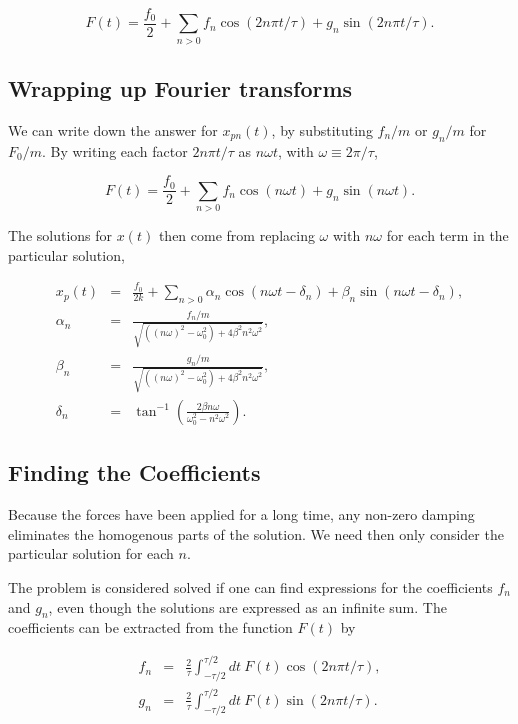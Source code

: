 \documentclass[%
oneside,                 %
final,                   %
10pt]{article}
\begin{document}
\begin{equation}
F(t)=\frac{f_0}{2}+\sum_{n>0} f_n\cos(2n\pi t/\tau)+g_n\sin(2n\pi t/\tau).
\end{equation}

\subsection*{Wrapping up Fourier transforms}

We can write down the answer for
$x_{pn}(t)$, by substituting $f_n/m$ or $g_n/m$ for $F_0/m$. By
writing each factor $2n\pi t/\tau$ as $n\omega t$, with $\omega\equiv
2\pi/\tau$,

\begin{equation}
\label{eq:fourierdef1}
F(t)=\frac{f_0}{2}+\sum_{n>0}f_n\cos(n\omega t)+g_n\sin(n\omega t).
\end{equation}

The solutions for $x(t)$ then come from replacing $\omega$ with
$n\omega$ for each term in the particular solution,

\begin{eqnarray}
x_p(t)&=&\frac{f_0}{2k}+\sum_{n>0} \alpha_n\cos(n\omega t-\delta_n)+\beta_n\sin(n\omega t-\delta_n),\\
\nonumber
\alpha_n&=&\frac{f_n/m}{\sqrt{((n\omega)^2-\omega_0^2)+4\beta^2n^2\omega^2}},\\
\nonumber
\beta_n&=&\frac{g_n/m}{\sqrt{((n\omega)^2-\omega_0^2)+4\beta^2n^2\omega^2}},\\
\nonumber
\delta_n&=&\tan^{-1}\left(\frac{2\beta n\omega}{\omega_0^2-n^2\omega^2}\right).
\end{eqnarray}

\subsection*{Finding the Coefficients}

Because the forces have been applied for a long time, any non-zero
damping eliminates the homogenous parts of the solution. We need then 
only consider the particular solution for each $n$.

The problem is considered solved if one can find expressions for the
coefficients $f_n$ and $g_n$, even though the solutions are expressed
as an infinite sum. The coefficients can be extracted from the
function $F(t)$ by

\begin{eqnarray}
\label{eq:fourierdef2}
f_n&=&\frac{2}{\tau}\int_{-\tau/2}^{\tau/2} dt~F(t)\cos(2n\pi t/\tau),\\
\nonumber
g_n&=&\frac{2}{\tau}\int_{-\tau/2}^{\tau/2} dt~F(t)\sin(2n\pi t/\tau).
\end{eqnarray}
\end{document}

